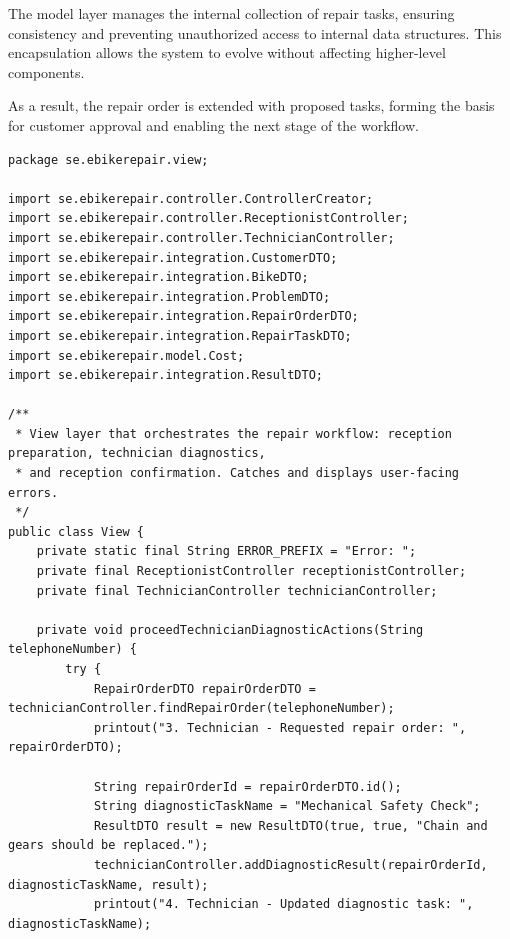 \documentclass[a4paper]{scrartcl}
\begin{document}
The model layer manages the internal collection of repair tasks, ensuring consistency and preventing unauthorized access to internal data structures. This encapsulation allows the system to evolve without affecting higher-level components.

As a result, the repair order is extended with proposed tasks, forming the basis for customer approval and enabling the next stage of the workflow.

\begin{lstlisting}[style=javastyle, caption={Main class entry point}]
package se.ebikerepair.view;

import se.ebikerepair.controller.ControllerCreator;
import se.ebikerepair.controller.ReceptionistController;
import se.ebikerepair.controller.TechnicianController;
import se.ebikerepair.integration.CustomerDTO;
import se.ebikerepair.integration.BikeDTO;
import se.ebikerepair.integration.ProblemDTO;
import se.ebikerepair.integration.RepairOrderDTO;
import se.ebikerepair.integration.RepairTaskDTO;
import se.ebikerepair.model.Cost;
import se.ebikerepair.integration.ResultDTO;

/**
 * View layer that orchestrates the repair workflow: reception preparation, technician diagnostics,
 * and reception confirmation. Catches and displays user-facing errors.
 */
public class View {
    private static final String ERROR_PREFIX = "Error: ";
    private final ReceptionistController receptionistController;
    private final TechnicianController technicianController;

    private void proceedTechnicianDiagnosticActions(String telephoneNumber) {
        try {
            RepairOrderDTO repairOrderDTO = technicianController.findRepairOrder(telephoneNumber);
            printout("3. Technician - Requested repair order: ", repairOrderDTO);

            String repairOrderId = repairOrderDTO.id();
            String diagnosticTaskName = "Mechanical Safety Check";
            ResultDTO result = new ResultDTO(true, true, "Chain and gears should be replaced.");
            technicianController.addDiagnosticResult(repairOrderId, diagnosticTaskName, result);
            printout("4. Technician - Updated diagnostic task: ", diagnosticTaskName);


\end{lstlisting}
\end{document}
